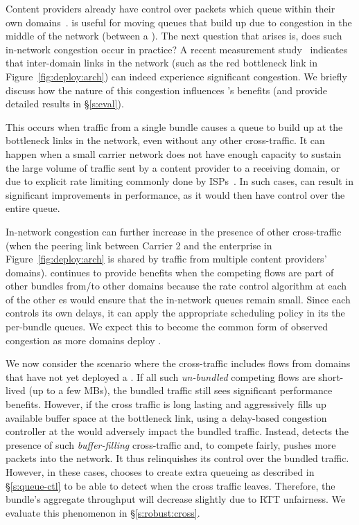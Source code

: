 Content providers already have control over packets which queue within their own domains~\cite{swan, b4, bwe}. \name is useful for moving queues that build up due to congestion in the middle of the network (\ie between a \pair).
The next question that arises is, does such in-network congestion occur in practice? A recent measurement study~\cite{inferring-interdomain-congestion} indicates that inter-domain links in the network (such as the red bottleneck link in Figure~\ref{fig:deploy:arch}) can indeed experience significant congestion. 
We briefly discuss how the nature of this congestion influences \name's benefits (and provide detailed results in \S\ref{s:eval}).

 This occurs when traffic from a single bundle causes a queue to build up at the bottleneck links in the network, even without any other cross-traffic. It can happen when a small carrier network does not have enough capacity to sustain the large volume of traffic sent by a content provider to a receiving domain, or due to explicit rate limiting commonly done by ISPs~\cite{isp-throttle-1, isp-throttle-2, isp-throttle-3}. In such cases, \name can result in
significant improvements in performance, as it would then have control over the entire queue. 

 In-network congestion can further increase in the presence of other cross-traffic (\eg when the peering link between Carrier 2 and the enterprise in Figure~\ref{fig:deploy:arch} is shared by traffic from multiple content providers' domains). 
\name continues to provide benefits when the competing flows are part of other bundles from/to other domains because the rate control algorithm at each of the other {\inbox}es would ensure that the in-network queues remain small. Since each \inbox controls its own delays, it can apply the appropriate scheduling policy in its the per-bundle queues.
We expect this to become the common form of observed congestion as more domains deploy \name. 

 We now consider the scenario where the cross-traffic includes flows from domains that have not yet deployed a \name. If all such \emph{un-bundled} competing flows are short-lived (up to a few MBs), the bundled traffic still sees significant performance benefits. 
However, if the cross traffic is long lasting and aggressively fills up available buffer space at the bottleneck link, using a delay-based congestion controller  at the \name would adversely impact the bundled traffic. 
Instead, \name detects the presence of such \emph{buffer-filling} cross-traffic and, to compete fairly, pushes more packets into the network. 
It thus relinquishes its control over the bundled traffic.
However, in these cases, \name chooses to create extra queueing as described in \S\ref{s:queue-ctl} to be able to detect when the cross traffic leaves.
Therefore, the bundle's aggregate throughput will decrease slightly due to RTT unfairness.
We evaluate this phenomenon in \S\ref{s:robust:cross}.


